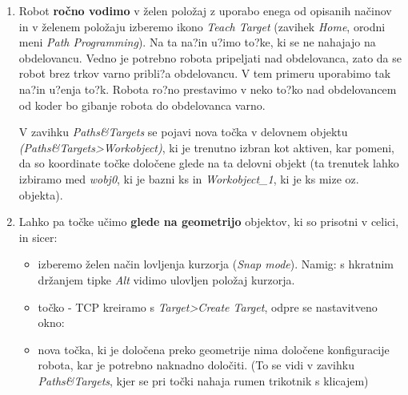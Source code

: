 \begin{enumerate}
\item  Robot \textbf{ročno vodimo} v želen položaj z uporabo enega od
opisanih načinov in v želenem položaju izberemo ikono \emph{Teach
Target} (zavihek \emph{Home}, orodni meni \emph{Path Programming}). Na ta na?in u?imo to?ke, ki se ne nahajajo na obdelovancu. Vedno je potrebno robota pripeljati nad obdelovanca, zato da se robot brez trkov varno pribli?a obdelovancu. V tem primeru uporabimo tak na?in u?enja to?k. Robota ro?no prestavimo v neko to?ko nad obdelovancem od koder bo gibanje robota do obdelovanca varno. 

V zavihku \emph{Paths\&Targets} se pojavi nova točka v delovnem
objektu \emph{(Paths\&Targets>Workobject)}, ki je trenutno izbran kot
aktiven, kar pomeni, da so koordinate točke določene glede na ta
delovni objekt (ta trenutek lahko izbiramo med \emph{wobj0}, ki je
bazni ks in \emph{Workobject\_1}, ki je ks mize oz. objekta).

\item Lahko pa točke učimo \textbf{glede na geometrijo} objektov, ki
so prisotni v celici, in sicer:

\begin{itemize}
\item izberemo želen način lovljenja kurzorja (\emph{Snap mode}).
Namig: s hkratnim držanjem tipke \emph{Alt} vidimo ulovljen položaj
kurzorja.

\item točko - TCP kreiramo s \emph{Target>Create Target}, odpre se
nastavitveno okno:


       \item  nova točka, ki je določena preko geometrije nima določene konfiguracije robota, kar je potrebno naknadno določiti. (To se vidi v zavihku \emph{Paths\&Targets}, kjer se pri točki
       nahaja rumen trikotnik s klicajem)


\end{itemize}
\end{enumerate}
